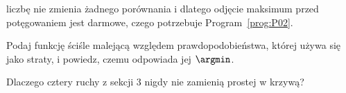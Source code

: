 \begin{furtherproblems}
{  liczbę nie zmienia żadnego porównania \dash{} i dlatego odjęcie maksimum
  przed potęgowaniem jest darmowe, czego potrzebuje Program~\ref{prog:P02}.}
\item Podaj funkcję ściśle malejącą względem prawdopodobieństwa, której używa
  się jako straty, i powiedz, czemu odpowiada jej $\argmin$.
\item Dlaczego cztery ruchy z sekcji 3 nigdy nie zamienią prostej w krzywą?
\end{furtherproblems}
